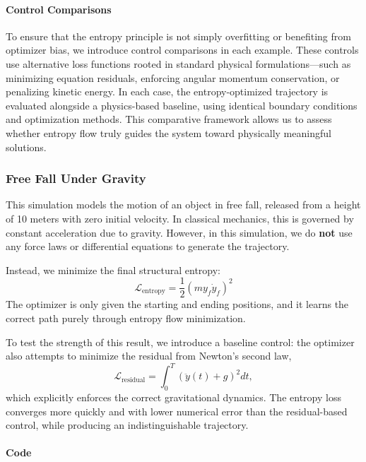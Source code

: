 \documentclass[12pt]{article}
\begin{document}
\paragraph{Control Comparisons}

To ensure that the entropy principle is not simply overfitting or benefiting from optimizer bias, we introduce control comparisons in each example. These controls use alternative loss functions rooted in standard physical formulations—such as minimizing equation residuals, enforcing angular momentum conservation, or penalizing kinetic energy. In each case, the entropy-optimized trajectory is evaluated alongside a physics-based baseline, using identical boundary conditions and optimization methods. This comparative framework allows us to assess whether entropy flow truly guides the system toward physically meaningful solutions.


\subsubsection{Free Fall Under Gravity}

This simulation models the motion of an object in free fall, released from a height of 10 meters with zero initial velocity. In classical mechanics, this is governed by constant acceleration due to gravity. However, in this simulation, we do \textbf{not} use any force laws or differential equations to generate the trajectory.

Instead, we minimize the final structural entropy:
\[
\mathcal{L}_{\text{entropy}} = \frac{1}{2} (m y_f \dot{y}_f)^2
\]
The optimizer is only given the starting and ending positions, and it learns the correct path purely through entropy flow minimization.

To test the strength of this result, we introduce a baseline control: the optimizer also attempts to minimize the residual from Newton's second law,
\[
\mathcal{L}_{\text{residual}} = \int_0^T \left(\ddot{y}(t) + g\right)^2 dt,
\]
which explicitly enforces the correct gravitational dynamics. The entropy loss converges more quickly and with lower numerical error than the residual-based control, while producing an indistinguishable trajectory.

\paragraph*{Code}\mbox{}
\end{document}
